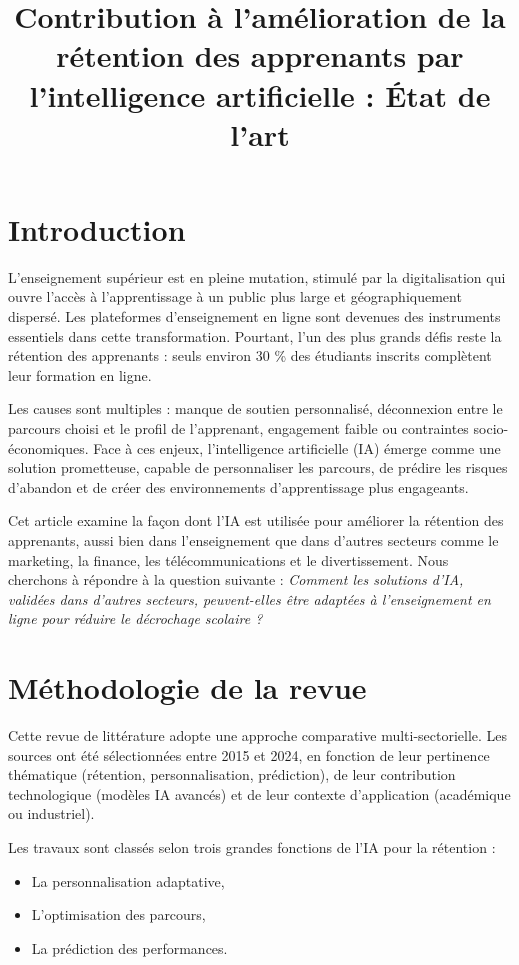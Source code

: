 \documentclass[12pt]{article}
\title{Contribution à l’amélioration de la rétention des apprenants par l’intelligence artificielle : État de l’art}
\author{}
\date{}
\begin{document}
\maketitle

\section{Introduction}
L’enseignement supérieur est en pleine mutation, stimulé par la digitalisation qui ouvre l’accès à l’apprentissage à un public plus large et géographiquement dispersé. Les plateformes d’enseignement en ligne sont devenues des instruments essentiels dans cette transformation. Pourtant, l'un des plus grands défis reste la rétention des apprenants : seuls environ 30 \% des étudiants inscrits complètent leur formation en ligne.

Les causes sont multiples : manque de soutien personnalisé, déconnexion entre le parcours choisi et le profil de l'apprenant, engagement faible ou contraintes socio-économiques. Face à ces enjeux, l’intelligence artificielle (IA) émerge comme une solution prometteuse, capable de personnaliser les parcours, de prédire les risques d’abandon et de créer des environnements d’apprentissage plus engageants.

Cet article examine la façon dont l’IA est utilisée pour améliorer la rétention des apprenants, aussi bien dans l’enseignement que dans d’autres secteurs comme le marketing, la finance, les télécommunications et le divertissement. Nous cherchons à répondre à la question suivante : \emph{Comment les solutions d’IA, validées dans d’autres secteurs, peuvent-elles être adaptées à l’enseignement en ligne pour réduire le décrochage scolaire ?}

\section{Méthodologie de la revue}
Cette revue de littérature adopte une approche comparative multi-sectorielle. Les sources ont été sélectionnées entre 2015 et 2024, en fonction de leur pertinence thématique (rétention, personnalisation, prédiction), de leur contribution technologique (modèles IA avancés) et de leur contexte d’application (académique ou industriel). 

Les travaux sont classés selon trois grandes fonctions de l’IA pour la rétention :
\begin{itemize}
  \item La personnalisation adaptative,
  \item L’optimisation des parcours,
  \item La prédiction des performances.
\end{itemize}
\end{document}
